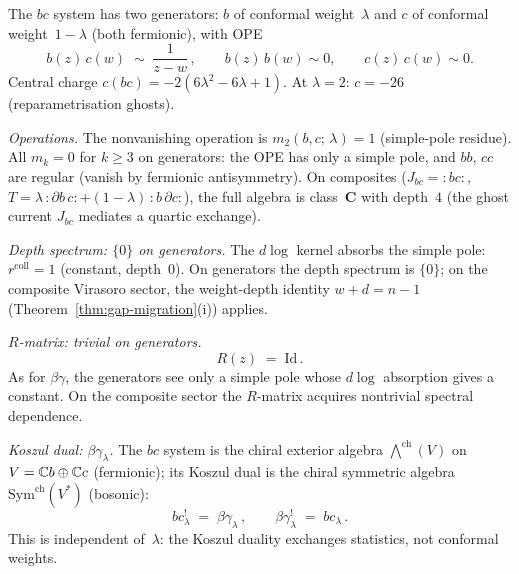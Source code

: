 \begin{computation}%
\label{comp:bc-ordered-bar}%
%
%
%
The $bc$ system has two generators: $b$ of conformal
weight~$\lambda$ and $c$ of conformal weight~$1-\lambda$
(both fermionic), with OPE
\begin{equation}\label{eq:bc-ope}
b(z)\,c(w)
\;\sim\;
\frac{1}{z-w}\,,
\qquad
b(z)\,b(w) \sim 0,
\qquad
c(z)\,c(w) \sim 0.
\end{equation}
Central charge $c(bc) = -2(6\lambda^2 - 6\lambda + 1)$.
At $\lambda = 2$: $c = -26$ (reparametrisation ghosts).

\smallskip
\noindent
\emph{Operations.}
The nonvanishing operation is
$m_2(b,c;\,\lambda) = 1$ (simple-pole residue).
All $m_k = 0$ for $k \ge 3$ on generators: the OPE has
only a simple pole, and $bb$, $cc$ are regular (vanish by
fermionic antisymmetry). On composites
($J_{bc} = {:}bc{:}$, $T = \lambda\,{:}\partial b\,c{:}
+ (1-\lambda)\,{:}b\,\partial c{:}$), the full algebra
is class~$\mathbf{C}$ with depth~$4$ (the ghost current
$J_{bc}$ mediates a quartic exchange).

\smallskip
\noindent
\emph{Depth spectrum: $\{0\}$ on generators.}
The $d\log$ kernel absorbs the simple pole:
$r^{\mathrm{coll}} = 1$ (constant, depth~$0$).
On generators the depth spectrum is $\{0\}$; on the composite Virasoro sector, the weight-depth identity $w + d = n - 1$ (Theorem~\ref{thm:gap-migration}(i)) applies.

\smallskip
\noindent
\emph{$R$-matrix: trivial on generators.}
\begin{equation}\label{eq:bc-R}
R(z) \;=\; \mathrm{Id}\,.
\end{equation}
As for $\beta\gamma$, the generators see only a simple pole
whose $d\log$ absorption gives a constant. On the composite
sector the $R$-matrix acquires nontrivial spectral
dependence.

\smallskip
\noindent
\emph{Koszul dual: $\beta\gamma_\lambda$.}
The $bc$ system is the chiral exterior algebra
$\bigwedge^{\mathrm{ch}}(V)$ on
$V = \mathbb{C} b \oplus \mathbb{C} c$ (fermionic); its Koszul dual is
the chiral symmetric algebra
$\mathrm{Sym}^{\mathrm{ch}}(V^*)$ (bosonic):
\begin{equation}\label{eq:bc-koszul-dual}
bc_\lambda^! \;=\; \beta\gamma_\lambda\,,
\qquad
\beta\gamma_\lambda^! \;=\; bc_\lambda\,.
\end{equation}
This is independent of~$\lambda$: the Koszul duality
exchanges statistics, not conformal weights.


\end{computation}
